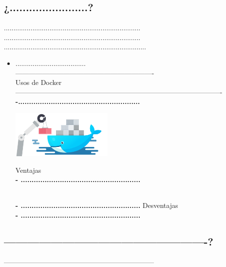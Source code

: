 \documentclass[twoside,twocolumn]{article}
\begin{document}
\subsection{¿........................?}

........................................................................\\
........................................................................\\
...........................................................................

\begin{itemize}
\item .....................................
\\ -------------------------------------------------------------
\\Usos de Docker
\\-------------------------------------------------------------------------------------------
\\ \textbf{-........................................................}


\begin{center}
	\includegraphics[width=5cm]{./Imagenes/docker} 
	\end{center}

Ventajas
\\ \textbf{- .......................................................}
 
\\ \textbf{- .......................................................}
Desventajas
\\ \textbf{- .......................................................}
\end{itemize} 

\subsection{----------------------------------------------------?}
------------------------------------------------------------------
\end{document}
